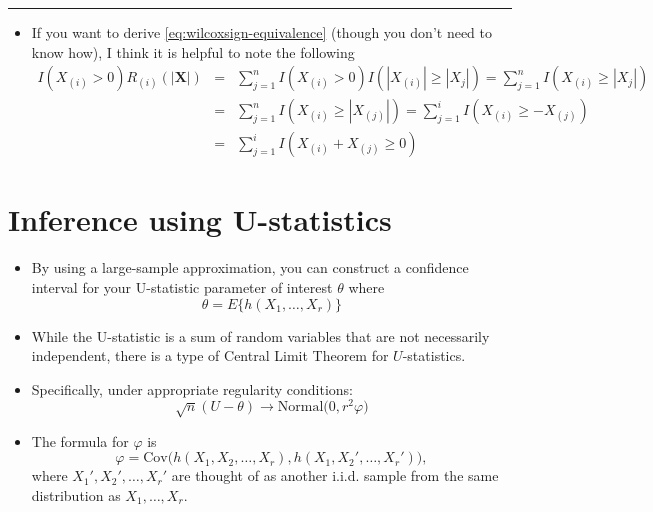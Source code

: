 \documentclass[]{book}
\providecommand{\tightlist}{%
  \setlength{\itemsep}{0pt}\setlength{\parskip}{0pt}}
\begin{document}
\begin{center}\rule{0.5\linewidth}{\linethickness}\end{center}

\begin{itemize}
\tightlist
\item
  If you want to derive \eqref{eq:wilcoxsign-equivalence} (though you don't need to know how), I think it is helpful to note
  the following
  \begin{eqnarray}
  I( X_{(i)} > 0)R_{(i)}(|\mathbf{X}|)
  &=& \sum_{j=1}^{n} I( X_{(i)} > 0)I(|X_{(i)}| \geq |X_{j}|)
  = \sum_{j=1}^{n} I(X_{(i)} \geq |X_{j}|) \nonumber \\
  &=& \sum_{j=1}^{n} I(X_{(i)} \geq |X_{(j)}|) 
  = \sum_{j=1}^{i} I(X_{(i)} \geq -X_{(j)}) \nonumber \\
  &=&  \sum_{j=1}^{i} I(X_{(i)} + X_{(j)} \geq 0) \nonumber
  \end{eqnarray}
\end{itemize}

\hypertarget{inference-using-u-statistics}{%
\section{Inference using U-statistics}\label{inference-using-u-statistics}}

\begin{itemize}
\item
  By using a large-sample approximation, you can construct a confidence interval
  for your U-statistic parameter of interest \(\theta\) where
  \begin{equation}
  \theta = E\Big\{ h(X_{1}, \ldots, X_{r})  \Big\}
  \end{equation}
\item
  While the U-statistic is a sum of random variables that are not necessarily independent,
  there is a type of Central Limit Theorem for \(U\)-statistics.
\item
  Specifically, under appropriate regularity conditions:
  \begin{equation}
  \sqrt{n}(U - \theta) \longrightarrow \textrm{Normal}\Big( 0, r^{2} \varphi \Big) \nonumber
  \end{equation}
\item
  The formula for \(\varphi\) is
  \begin{equation}
  \varphi = \textrm{Cov}\Big( h(X_{1}, X_{2}, \ldots, X_{r}) , h(X_{1}, X_{2}', \ldots, X_{r}') \Big), \nonumber
  \end{equation}
  where \(X_{1}', X_{2}', \ldots, X_{r}'\) are thought of as another i.i.d. sample from
  the same distribution as \(X_{1}, \ldots, X_{r}\).
\end{itemize}
\end{document}
